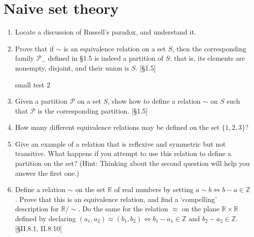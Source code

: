 \section{Naive set theory}
\begin{enumerate}
    \item Locate a discussion of Russell's paradox, and understand it.
    \item Prove that if $\sim$ is an equivalence relation on a set $S$, then the corresponding family $\mathcal{P}_{\sim}$ defined in \S1.5 is indeed a partition of $S$: that is, its elements are nonempty, disjoint, and their union is $S$. [\S1.5]

          \begin{solution}
            \lipsum[1]

            small test 2
          \end{solution}

    \item Given a partition $\mathcal{P}$ on a set $S$, show how to define a relation $\sim$ on $S$ such that $\mathcal{P}$ is the corresponding partition. [\S1.5]
    \item How many different equivalence relations may be defined on the set $\{1, 2, 3\}$?
    \item Give an example of a relation that is reflexive and symmetric but not transitive. What happens if you attempt to use this relation to define a partition on the set? (Hint: Thinking about the second question will help you answer the first one.)
    \item Define a relation $\sim$ on the set $\mathbb{R}$ of real numbers by setting $a \sim b \iff b-a \in \mathbb{Z}$. Prove that this is an equivalence relation, and find a `compelling' description for $\mathbb{R}/\sim$. Do the same for the relation $\approx$ on the plane $\mathbb{R} \times \mathbb{R}$ defined by declaring $(a_1, a_2) \approx (b_1, b_2) \iff b_1 - a_1 \in \mathbb{Z} \text{ and } b_2 - a_2 \in \mathbb{Z}$. [\S II.8.1, II.8.10]
\end{enumerate}
